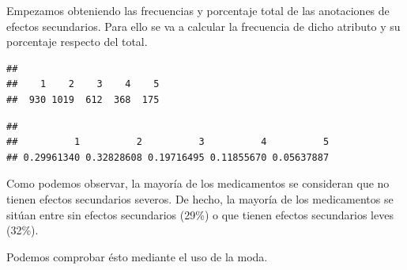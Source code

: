 \documentclass[spanish,]{article}
\newenvironment{Shaded}{\begin{snugshade}}{\end{snugshade}}
\newcommand{\KeywordTok}[1]{\textcolor[rgb]{0.13,0.29,0.53}{\textbf{#1}}}
\newcommand{\DecValTok}[1]{\textcolor[rgb]{0.00,0.00,0.81}{#1}}
\newcommand{\StringTok}[1]{\textcolor[rgb]{0.31,0.60,0.02}{#1}}
\newcommand{\CommentTok}[1]{\textcolor[rgb]{0.56,0.35,0.01}{\textit{#1}}}
\newcommand{\OperatorTok}[1]{\textcolor[rgb]{0.81,0.36,0.00}{\textbf{#1}}}
\newcommand{\NormalTok}[1]{#1}
\begin{document}
Empezamos obteniendo las frecuencias y porcentaje total de las
anotaciones de efectos secundarios. Para ello se va a calcular la
frecuencia de dicho atributo y su porcentaje respecto del total.

\begin{Shaded}
\end{Shaded}

\begin{verbatim}
## 
##    1    2    3    4    5 
##  930 1019  612  368  175
\end{verbatim}

\begin{Shaded}
\end{Shaded}

\begin{verbatim}
## 
##          1          2          3          4          5 
## 0.29961340 0.32828608 0.19716495 0.11855670 0.05637887
\end{verbatim}

Como podemos observar, la mayoría de los medicamentos se consideran que
no tienen efectos secundarios severos. De hecho, la mayoría de los
medicamentos se sitúan entre sin efectos secundarios (29\%) o que tienen
efectos secundarios leves (32\%).

Podemos comprobar ésto mediante el uso de la moda.

\begin{Shaded}
\end{Shaded}
\end{document}

